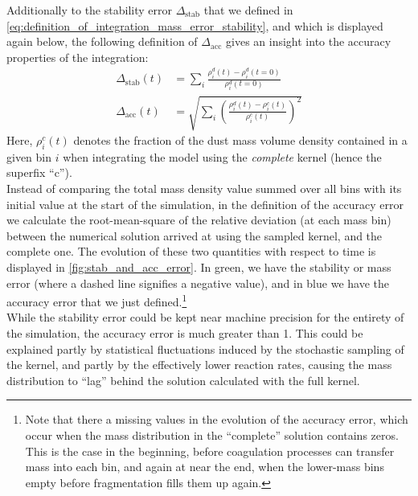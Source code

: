     Additionally to the stability error $\Delta_\text{stab}$ that we defined in
    \cref{eq:definition_of_integration_mass_error_stability}, and which is displayed 
    again below, the following definition of $\Delta_\text{acc}$ gives an 
    insight into the accuracy properties of the integration:
    \begin{align}
        \Delta_\text{stab}(t)
            &= \sum_i \frac{\rho^d_i(t) - \rho^d_i(t=0)}{\rho^d_i(t=0)} \\
        \Delta_\text{acc}(t)
            &= \sqrt{ \sum_i \left(
                \frac{\rho^d_i(t) - \rho^c_i(t)}{\rho^c_i(t)}
            \right)^2 }
    \end{align}
    Here, $\rho^c_i(t)$ denotes the fraction of the dust mass volume density 
    contained in a given bin $i$ when integrating the model 
    using the \textit{complete} kernel (hence the superfix ``c''). \\

    Instead of comparing the total mass density value summed over all bins with its 
    initial value at the start of the simulation, in the definition of the accuracy error 
    we calculate the root-mean-square of the relative deviation (at each mass bin)
    between the numerical solution arrived at using the sampled kernel, and the complete one. 
    The evolution of these two quantities with respect to time is displayed in 
    \cref{fig:stab_and_acc_error}. In green, we have the stability or mass error
    (where a dashed line signifies a negative value), and in blue we have the accuracy
    error that we just defined.\footnote{
        Note that there a missing values in the evolution of the accuracy error,
        which occur when the mass distribution in the ``complete'' solution contains 
        zeros. This is the case in the beginning, before coagulation processes can 
        transfer mass into each bin, and again at near the end, when the lower-mass 
        bins empty before fragmentation fills them up again. 
    }
    \\

    While the stability error could be kept near machine precision for the entirety of the 
    simulation, the accuracy error is much greater than 1. 
    This could be explained partly by statistical fluctuations induced by the 
    stochastic sampling of the kernel, and partly by the effectively lower reaction 
    rates, causing the mass distribution to ``lag'' behind the solution calculated with 
    the full kernel. \\

